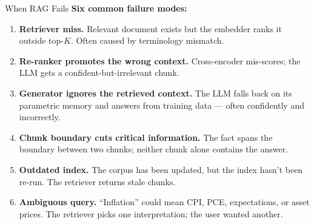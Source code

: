 \documentclass[10pt,english,aspectratio=169]{beamer}
\begin{document}
\begin{frame}{When RAG Fails}
\textbf{Six common failure modes:}
\begin{enumerate}
\item \textbf{Retriever miss.} Relevant document exists but the embedder ranks it outside top-$K$. Often caused by terminology mismatch.

\medskip
\item \textbf{Re-ranker promotes the wrong context.} Cross-encoder mis-scores; the LLM gets a confident-but-irrelevant chunk.

\medskip
\item \textbf{Generator ignores the retrieved context.} The LLM falls back on its parametric memory and answers from training data --- often confidently and incorrectly.

\medskip
\item \textbf{Chunk boundary cuts critical information.} The fact spans the boundary between two chunks; neither chunk alone contains the answer.

\medskip
\item \textbf{Outdated index.} The corpus has been updated, but the index hasn't been re-run. The retriever returns stale chunks.

\medskip
\item \textbf{Ambiguous query.} ``Inflation'' could mean CPI, PCE, expectations, or asset prices. The retriever picks one interpretation; the user wanted another.
\end{enumerate}
\end{frame}
\end{document}
